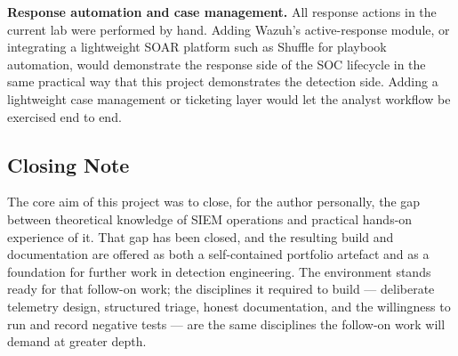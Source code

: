 \textbf{Response automation and case management.} All response actions in
the current lab were performed by hand. Adding Wazuh's active-response
module, or integrating a lightweight SOAR platform such as Shuffle for
playbook automation, would demonstrate the response side of the SOC
lifecycle in the same practical way that this project demonstrates the
detection side. Adding a lightweight case management or ticketing layer
would let the analyst workflow be exercised end to end.

\subsection{Closing Note}

The core aim of this project was to close, for the author personally, the
gap between theoretical knowledge of SIEM operations and practical
hands-on experience of it. That gap has been closed, and the resulting
build and documentation are offered as both a self-contained portfolio
artefact and as a foundation for further work in detection engineering.
The environment stands ready for that follow-on work; the disciplines it
required to build --- deliberate telemetry design, structured triage,
honest documentation, and the willingness to run and record negative
tests --- are the same disciplines the follow-on work will demand at
greater depth.
